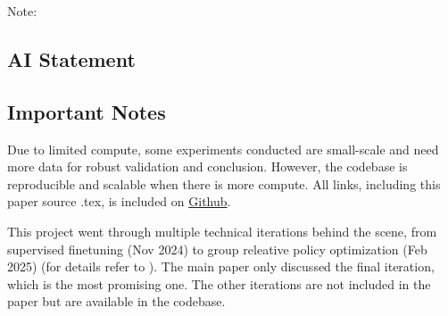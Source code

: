 Note:

\subsection*{AI Statement}
\subsection*{Important Notes}

Due to limited compute, some experiments conducted are small-scale and need more data for robust validation and conclusion. However, the codebase is reproducible and scalable when there is more compute. All links, including this paper source .tex, is included on \hyperlink{https://github.com/chiffonng/mnemonic-gen}{Github}.

This project went through multiple technical iterations behind the scene, from supervised finetuning (Nov 2024) to group releative policy optimization (Feb 2025) (for details refer to ). The main paper only discussed the final iteration, which is the most promising one. The other iterations are not included in the paper but are available in the codebase.
\clearpage

\tableofcontents
